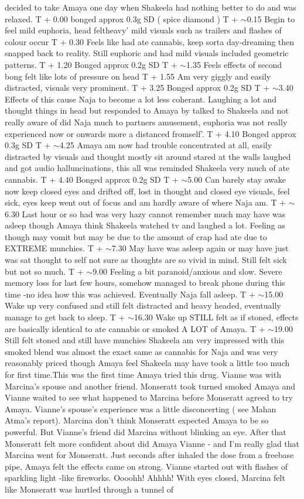 \documentclass[12pt]{book}
\begin{document}
decided to take Amaya one day when Shakeela had nothing better to do and was relaxed. T + 0.00 bonged approx 0.3g SD ( spice diamond ) T + $\sim$0.15 Begin to feel mild euphoria, head feltheavy' mild visuals such as trailers and flashes of colour occur T + 0.30 Feels like had ate cannabis, keep sorta day-dreaming then snapped back to reality. Still euphoric and had mild visuals included geometric patterns. T + 1.20 Bonged approx 0.2g SD T + $\sim$1.35 Feels effects of second bong felt like lots of pressure on head T + 1.55 Am very giggly and easily distracted, visuals very prominent. T + 3.25 Bonged approx 0.2g SD T + $\sim$3.40 Effects of this cause Naja to become a lot less coherant. Laughing a lot and thought things in head but responded to Amaya by talked to Shakeela and not really aware of did Naja much to partners amusement, euphoria was not really experienced now or onwards more a distanced fromself'. T + 4.10 Bonged approx 0.3g SD T + $\sim$4.25 Amaya am now had trouble concentrated at all, easily distracted by visuals and thought mostly sit around stared at the walls laughed and got audio halluncinations, this all was reminded Shakeela very much of ate cannabis. T + 4.40 Bonged approx 0.2g SD T + $\sim$5.00 Can barely stay awake now keep closed eyes and drifted off, lost in thought and closed eye visuals, feel sick, eyes keep went out of focus and am hardly aware of where Naja am. T + $\sim$6.30 Last hour or so had was very hazy cannot remember much may have was asleep though Amaya think Shakeela watched tv and laughed a lot. Feeling as though may vomit but may be due to the amount of crap had ate due to EXTREME munchies. T + $\sim$7.30 May have was asleep again or may have just was sat thought to self not sure as thoughts are so vivid in mind. Still felt sick but not so much. T + $\sim$9.00 Feeling a bit paranoid/anxious and slow. Severe memory loss for last few hours, somehow managed to break phone during this time -no idea how this was achieved. Eventually Naja fall asleep. T + $\sim$15.00 Wake up very confused and still felt distracted and heavy headed, eventually manage to get back to sleep. T + $\sim$16.30 Wake up STILL felt as if stoned, effects are basically identical to ate cannabis or smoked A LOT of Amaya. T + $\sim$19.00 Still felt stoned and still have munchies Shakeela am very impressed with this smoked blend was almost the exact same as cannabis for Naja and was very reasonably priced though Amaya feel Shakeela may have took a little too much for first time.This was the first time Amaya tried this drug. Vianne was with Marcina's spouse and another friend. Monseratt took turned smoked Amaya and Vianne waited to see what happened to Marcina before Monseratt agreed to try Amaya. Vianne's spouse's experience was a little disconcerting ( see Mahan Atma's report). Marcina don't think Monseratt expected Amaya to be so powerful. But Vianne's friend did Marcina without blinking an eye. After that Monseratt felt more confident about did Amaya Vianne - and I'm really glad that Marcina went for Monseratt. Just seconds after inhaled the dose from a freebase pipe, Amaya felt the effects came on strong. Vianne started out with flashes of sparkling light -like fireworks. Oooohh! Ahhhh! With eyes closed, Marcina felt like Monseratt was hurtled through a tunnel of 
\end{document}
